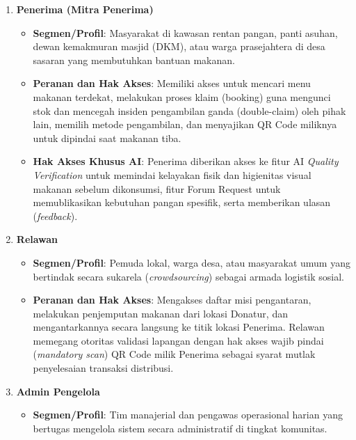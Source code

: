 \begin{enumerate}
\begin{itemize}
\begin{itemize}
            \item \textbf{\textit{Generate} Konten Media Sosial}: Hak spesial untuk secara otomatis menghasilkan gambar visual desain (lengkap dengan stiker verifikasi AI dan logo perusahaan) sekaligus memproduksi konten tulisan (\textit{copywriting}) promosi yang siap diunggah ke platform media sosial.
        \end{itemize}
    \end{itemize}
    \item \textbf{Penerima (Mitra Penerima)}
    \begin{itemize}
        \item \textbf{Segmen/Profil}: Masyarakat di kawasan rentan pangan, panti asuhan, dewan kemakmuran masjid (DKM), atau warga prasejahtera di desa sasaran yang membutuhkan bantuan makanan.
        \item \textbf{Peranan dan Hak Akses}: Memiliki akses untuk mencari menu makanan terdekat, melakukan proses klaim (booking) guna mengunci stok dan mencegah insiden pengambilan ganda (double-claim) oleh pihak lain, memilih metode pengambilan, dan menyajikan QR Code miliknya untuk dipindai saat makanan tiba.
        \item \textbf{Hak Akses Khusus AI}: Penerima diberikan akses ke fitur AI \textit{Quality Verification} untuk memindai kelayakan fisik dan higienitas visual makanan sebelum dikonsumsi, fitur Forum Request untuk memublikasikan kebutuhan pangan spesifik, serta memberikan ulasan (\textit{feedback}).
    \end{itemize}
    \item \textbf{Relawan}
    \begin{itemize}
        \item \textbf{Segmen/Profil}: Pemuda lokal, warga desa, atau masyarakat umum yang bertindak secara sukarela (\textit{crowdsourcing}) sebagai armada logistik sosial.
        \item \textbf{Peranan dan Hak Akses}: Mengakses daftar misi pengantaran, melakukan penjemputan makanan dari lokasi Donatur, dan mengantarkannya secara langsung ke titik lokasi Penerima. Relawan memegang otoritas validasi lapangan dengan hak akses wajib pindai (\textit{mandatory scan}) QR Code milik Penerima sebagai syarat mutlak penyelesaian transaksi distribusi.
    \end{itemize}
    \item \textbf{Admin Pengelola}
    \begin{itemize}
        \item \textbf{Segmen/Profil}: Tim manajerial dan pengawas operasional harian yang bertugas mengelola sistem secara administratif di tingkat komunitas.

\end{itemize}
\end{enumerate}
